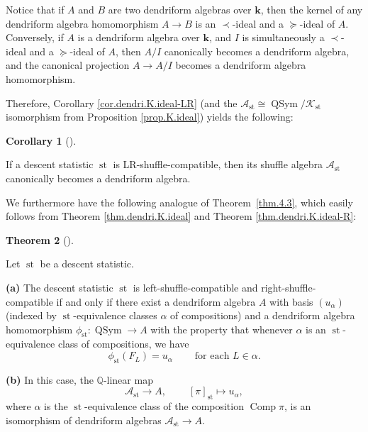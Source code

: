 \documentclass[numbers=enddot,12pt,final,onecolumn,notitlepage]{scrartcl}%
\theoremstyle{definition}
\newtheorem{theo}{Theorem}[section]
\newenvironment{theorem}[1][]
{\begin{theo}[#1]\begin{leftbar}}
{\end{leftbar}\end{theo}}
\newtheorem{coro}[theo]{Corollary}
\newenvironment{corollary}[1][]
{\begin{coro}[#1]\begin{leftbar}}
{\end{leftbar}\end{coro}}
\newenvironment{vershort}{}{}
\begin{document}
\begin{vershort}
Notice that if $A$ and $B$ are two dendriform algebras over $\mathbf{k}$, then
the kernel of any dendriform algebra homomorphism $A\rightarrow B$ is an
$\left.  \prec\right.  $-ideal and a $\left.  \succeq\right.  $-ideal of $A$.
Conversely, if $A$ is a dendriform algebra over $\mathbf{k}$, and $I$ is
simultaneously a $\left.  \prec\right.  $-ideal and a $\left.  \succeq
\right.  $-ideal of $A$, then $A/I$ canonically becomes a dendriform algebra,
and the canonical projection $A\rightarrow A/I$ becomes a dendriform algebra homomorphism.

Therefore, Corollary \ref{cor.dendri.K.ideal-LR} (and the $\mathcal{A}%
_{\operatorname{st}}\cong\operatorname*{QSym}/\mathcal{K}_{\operatorname{st}%
}$ isomorphism from Proposition \ref{prop.K.ideal}) yields the following:

\begin{corollary}
If a descent statistic $\operatorname{st}$ is LR-shuffle-compatible, then its
shuffle algebra $\mathcal{A}_{\operatorname{st}}$ canonically becomes a
dendriform algebra.
\end{corollary}

We furthermore have the following analogue of Theorem~\ref{thm.4.3}, which
easily follows from Theorem \ref{thm.dendri.K.ideal} and Theorem
\ref{thm.dendri.K.ideal-R}:

\begin{theorem}
\label{thm.dendri.4.3}Let $\operatorname{st}$ be a descent statistic.

\textbf{(a)} The descent statistic $\operatorname{st}$ is
left-shuffle-compatible and right-shuffle-compatible if and only if there
exist a dendriform algebra $A$ with
basis $\left(  u_{\alpha}\right)  $ (indexed by $\operatorname{st}%
$-equivalence classes $\alpha$ of compositions)
and a dendriform algebra homomorphism
$\phi_{\operatorname{st}}:\operatorname*{QSym} \rightarrow A$
with the property that whenever $\alpha$ is an
$\operatorname{st}$-equivalence class of compositions, we have
\[
\phi_{\operatorname{st}}\left(  F_{L}\right)  =u_{\alpha}%
\ \ \ \ \ \ \ \ \ \ \text{for each }L\in\alpha.
\]

\textbf{(b)} In this case, the $\mathbb{Q}$-linear map%
\[
\mathcal{A}_{\operatorname{st}}\rightarrow A,\ \ \ \ \ \ \ \ \ \ \left[
\pi\right]  _{\operatorname{st}}\mapsto u_{\alpha},
\]
where $\alpha$ is the $\operatorname{st}$-equivalence class of the
composition $\operatorname*{Comp}\pi$, is an isomorphism of dendriform
algebras $\mathcal{A}_{\operatorname{st}}\rightarrow A$.
\end{theorem}


\end{vershort}
\end{document}
